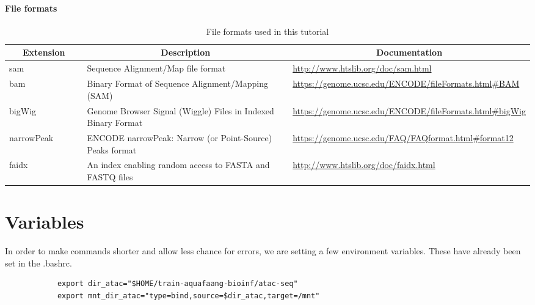 \documentclass[12pt]{article}
\begin{document}
	\paragraph{File formats}
			
		\begin{table}[H]
			\begin{center}
				\begin{adjustbox}{width=1\textwidth}
					\begin{tabular}{p{0.15\linewidth} | p{0.4\linewidth} | p{0.5\linewidth}}

						\multicolumn{1}{c}{ \textbf{Extension}} & \multicolumn{1}{c}{\textbf{Description}} & \multicolumn{1}{c}{\textbf{Documentation}} \\
						\hline
						sam & Sequence Alignment/Map file format &\url{http://www.htslib.org/doc/sam.html} \\
						\hline
						bam & Binary Format of Sequence Alignment/Mapping (SAM) & \url{https://genome.ucsc.edu/ENCODE/fileFormats.html#BAM}\\
						\hline
						bigWig & Genome Browser Signal (Wiggle) Files in Indexed Binary Format & \url{https://genome.ucsc.edu/ENCODE/fileFormats.html#bigWig}\\
						\hline
						narrowPeak & ENCODE narrowPeak: Narrow (or Point-Source) Peaks format& \url{https://genome.ucsc.edu/FAQ/FAQformat.html#format12}  \\
						\hline
						faidx & An index enabling random access to FASTA and FASTQ files & \url{http://www.htslib.org/doc/faidx.html} \\
						\hline 
					\end{tabular}
				\end{adjustbox}
				\caption[FileFormats]{File formats used in this tutorial }
				\label{table:genrich}
			\end{center}
		\end{table}
	

	
	\section{Variables}
	In order to make commands shorter and allow less chance for errors, we are setting a few  environment variables. These have already been set in the .bashrc.
	
	\vspace{0.5cm}	
	\begin{minipage}{\linewidth}
		\begin{lstlisting}
			export dir_atac="$HOME/train-aquafaang-bioinf/atac-seq"
			export mnt_dir_atac="type=bind,source=$dir_atac,target=/mnt"
		\end{lstlisting}
	\end{minipage}
\end{document}
